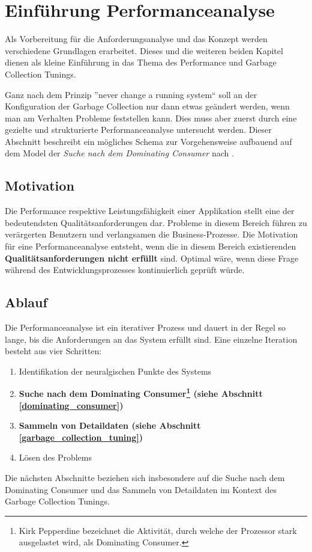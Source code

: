 \chapter{Einführung Performanceanalyse}
Als Vorbereitung für die Anforderungsanalyse und das Konzept werden verschiedene Grundlagen erarbeitet. Dieses und die weiteren beiden Kapitel dienen als kleine Einführung in das Thema des Performance und Garbage Collection Tunings.


Ganz nach dem Prinzip ''never change a running system`` soll an der Konfiguration der Garbage Collection nur dann etwas geändert werden, wenn man am Verhalten Probleme feststellen kann. Dies muss aber zuerst durch eine gezielte und strukturierte Performanceanalyse untersucht werden. Dieser Abschnitt beschreibt ein mögliches Schema zur Vorgehensweise aufbauend auf dem Model der \textit{Suche  nach dem Dominating Consumer} nach \cite{pepperdine201102}.

\section{Motivation}
Die Performance respektive Leistungsfähigkeit einer Applikation stellt eine der bedeutendsten Qualitätsanforderungen dar. Probleme in diesem Bereich führen zu verärgerten Benutzern und verlangsamen die Business-Prozesse. Die Motivation für eine Performanceanalyse entsteht, wenn die in diesem Bereich existierenden \textbf{Qualitätsanforderungen nicht erfüllt} sind. Optimal wäre, wenn diese Frage während des Entwicklungsprozesses kontinuierlich geprüft würde.

\section{Ablauf}
Die Performanceanalyse ist ein iterativer Prozess und dauert in der Regel so lange, bis die Anforderungen an das System erfüllt sind. Eine einzelne Iteration besteht aus vier Schritten\cite{hummelBeer201109}:
\begin{enumerate}
	\item Identifikation der neuralgischen Punkte des Systems
	\item \textbf{Suche nach dem Dominating Consumer\footnote{Kirk Pepperdine bezeichnet die Aktivität, durch welche der Prozessor stark ausgelastet wird, als Dominating Consumer. } (siehe Abschnitt \ref{dominating_consumer})}
	\item \textbf{Sammeln von Detaildaten (siehe Abschnitt \ref{garbage_collection_tuning})}
	\item Lösen des Problems
\end{enumerate}
Die nächsten Abschnitte beziehen sich insbesondere auf die Suche nach dem Dominating Consumer und das Sammeln von Detaildaten im Kontext des Garbage Collection Tunings.

